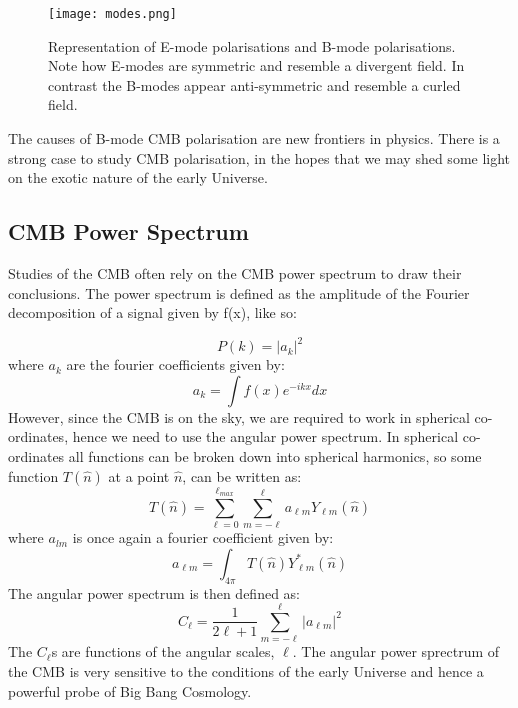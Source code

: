 \begin{SCfigure}
\centering
\texttt{[image: modes.png]}
\caption{Representation of E-mode polarisations and B-mode polarisations. Note how E-modes are symmetric and resemble a divergent field. In contrast the B-modes appear anti-symmetric and resemble a curled field.}
\label{fig:modes}
\end{SCfigure}

The causes of B-mode CMB polarisation are new frontiers in physics. There is a strong case to study CMB polarisation, in the hopes that we may shed some light on the exotic nature of the early Universe.

\subsection{CMB Power Spectrum}

Studies of the CMB often rely on the CMB power spectrum to draw their conclusions. The power spectrum is defined as the amplitude of the Fourier decomposition of a signal given by f(x), like so:

\begin{equation}
P(k) = \vert a_k \vert ^2
\end{equation}
where $a_k$ are the fourier coefficients given by:
\begin{equation}
a_k = \int f(x) e^{-ikx} dx
\end{equation}
However, since the CMB is on the sky, we are required to work in spherical co-ordinates, hence we need to use the angular power spectrum. In spherical co-ordinates all functions can be broken down into spherical harmonics, so some function $T(\hat{n})$ at a point $\hat{n}$, can be written as:
\begin{equation}
T(\hat{n}) = \sum_{\ell = 0}^{\ell_{max}} \sum_{m = -\ell}^{\ell} a_{\ell m} Y_{\ell m}(\hat{n})
\end{equation}
where $a_{lm}$ is once again a fourier coefficient given by:
\begin{equation}
a_{\ell m} = \int_{4 \pi} T(\hat{n}) Y_{\ell m}^{*}(\hat{n})
\end{equation}
The angular power spectrum is then defined as:
\begin{equation}
C_{\ell} = \frac{1}{2\ell + 1} \sum_{m = -\ell}^{\ell} \vert a_{\ell m} \vert ^2
\end{equation}
The $C_{\ell}$s are functions of the angular scales, $\ell$. The angular power sprectrum of the CMB is very sensitive to the conditions of the early Universe and hence a powerful probe of Big Bang Cosmology.

